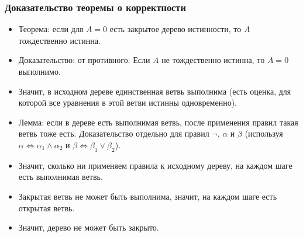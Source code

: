 \documentclass[10pt]{beamer}
\begin{document}
\begin{frame}
    \frametitle{Доказательство теоремы о корректности}
    \begin{itemize}
        \item Теорема: если для $A=0$ есть закрытое дерево истинности, то $A$ тождественно истинна.
        \item Доказательство: от противного. Если $A$ не тождественно истинна, то $A=0$ выполнимо.
        \pause
        \item Значит, в исходном дереве единственная ветвь выполнима (есть оценка, для которой все уравнения в этой ветви истинны одновременно).
        \pause
        \item Лемма: если в дереве есть выполнимая ветвь, после применения правил такая ветвь тоже есть. Доказательство отдельно для правил $\neg$, $\alpha$ и $\beta$ (используя $\alpha \Leftrightarrow \alpha_1 \land \alpha_2$ и $\beta \Leftrightarrow \beta_1 \lor \beta_2$).
        \pause
        \item Значит, сколько ни применяем правила к исходному дереву, на каждом шаге есть выполнимая ветвь.
        \pause
        \item Закрытая ветвь не может быть выполнима, значит, на каждом шаге есть открытая ветвь.
        \item Значит, дерево не может быть закрыто.
    \end{itemize}
\end{frame}
\end{document}
